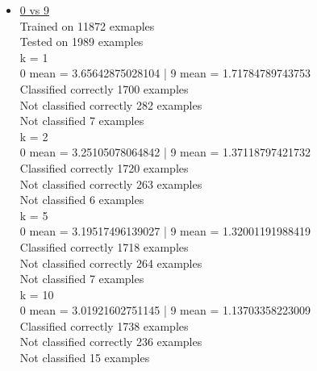 \documentclass[11pt]{article}
\theoremstyle{definition}
\theoremstyle{definition}
\begin{document}
\begin{itemize}
	\item
		\underline{0 vs 9}\\
Trained on 11872 exmaples\\
Tested on  1989 examples\\
k = 1\\
0 mean = 3.65642875028104 | 9 mean = 1.71784789743753\\
Classified correctly 1700 examples\\
Not classified correctly 282 examples\\
Not classified 7 examples\\
k = 2\\
0 mean = 3.25105078064842 | 9 mean = 1.37118797421732\\
Classified correctly 1720 examples\\
Not classified correctly 263 examples\\
Not classified 6 examples\\
k = 5\\
0 mean = 3.19517496139027 | 9 mean = 1.32001191988419\\
Classified correctly 1718 examples\\
Not classified correctly 264 examples\\
Not classified 7 examples\\
k = 10\\
0 mean = 3.01921602751145 | 9 mean = 1.13703358223009\\
Classified correctly 1738 examples\\
Not classified correctly 236 examples\\
Not classified 15 examples


\end{itemize}
\end{document}

